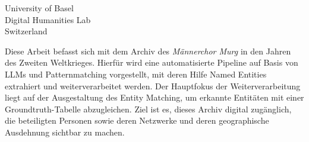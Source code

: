\documentclass[12pt, a4paper, ngerman, bidi=default]{article}
\renewcommand*\contentsname{Inhaltsverzeichnis}
\newcommand\contentsname{Inhaltsverzeichnis}
\begin{document}
\begin{titlepage}
\begin{center}
    University of Basel\\
    Digital Humanities Lab\\
    Switzerland
\end{center}


\newpage
\color{black}          %
\end{titlepage}
\newpage




\pagecolor{white}  
\color{black}  %
\color{black} 


\newpage 
Diese Arbeit befasst sich mit dem Archiv des \textit{Männerchor Murg} in den Jahren des Zweiten Weltkrieges. 
Hierfür wird eine automatisierte Pipeline auf Basis von LLMs und Patternmatching vorgestellt, mit deren Hilfe Named Entities extrahiert und weiterverarbeitet werden. Der Hauptfokus der Weiterverarbeitung liegt auf der Ausgestaltung des Entity Matching, um erkannte Entitäten mit einer Groundtruth-Tabelle abzugleichen. 
Ziel ist es, dieses Archiv digital zugänglich, die beteiligten Personen sowie deren Netzwerke und deren geographische Ausdehnung sichtbar zu machen.






\newpage
\renewcommand*\contentsname{Inhaltsverzeichnis}%
{
\hypersetup{linkcolor=}
\setcounter{tocdepth}{4}%
\tableofcontents
}
\end{document}
